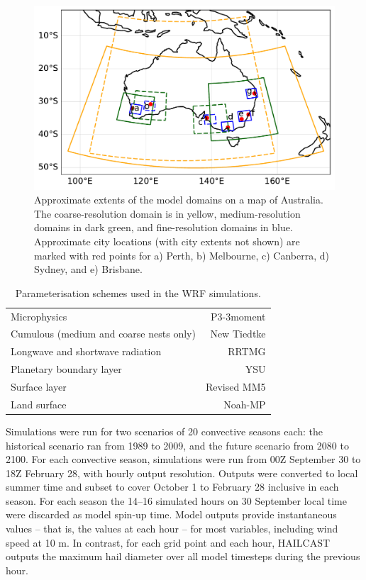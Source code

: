 \documentclass[]{agujournal2019}\usepackage[]{graphicx}\usepackage[]{xcolor}
\begin{document}
\begin{figure}[!h]
      \includegraphics[width=\textwidth]{figures/domains}
      \caption{Approximate extents of the model domains on a map of Australia. The coarse-resolution domain is in yellow, medium-resolution domains in dark green, and fine-resolution domains in blue. Approximate city locations (with city extents not shown) are marked with red points for a) Perth, b) Melbourne, c) Canberra, d) Sydney, and e) Brisbane.}
      \label{fig:domains}
\end{figure}

\begin{table}[!ht]
\caption{Parameterisation schemes used in the WRF simulations.}
\label{tab:schemes}
\centering
\begin{tabular}{lr}
      \hline
      Microphysics & P3-3moment \cite{Milbrandt_JAS_2021} \\
      Cumulous (medium and coarse nests only) & New Tiedtke \cite{Zhang_JC_2017} \\
      Longwave and shortwave radiation & RRTMG \cite{Iacono_JGRA_2008} \\
      Planetary boundary layer & YSU \cite{Hong_MWR_2006} \\
      Surface layer & Revised MM5 \cite{Jimenez_MWR_2012} \\
      Land surface & Noah-MP \cite{Niu_JGRA_2011} \\
      \hline
\end{tabular}
\end{table}

Simulations were run for two scenarios of 20 convective seasons each: the historical scenario ran from 1989 to 2009, and the future scenario from 2080 to 2100. For each convective season, simulations were run from 00Z September 30 to 18Z February 28, with hourly output resolution. Outputs were converted to local summer time and subset to cover October 1 to February 28 inclusive in each season. For each season the 14--16 simulated hours on 30 September local time were discarded as model spin-up time. Model outputs provide instantaneous values -- that is, the values at each hour -- for most variables, including wind speed at 10 m. In contrast, for each grid point and each hour, HAILCAST outputs the maximum hail diameter over all model timesteps during the previous hour. 
\end{document}
